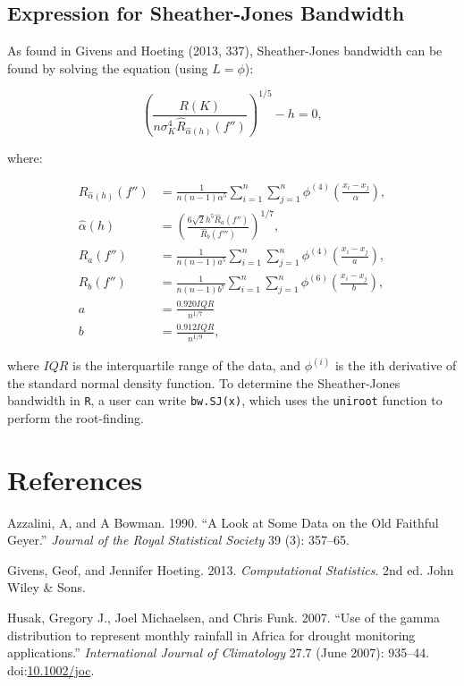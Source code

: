 \documentclass[]{article}
\begin{document}
\subsection{Expression for Sheather-Jones
Bandwidth}\label{expression-for-sheather-jones-bandwidth}

As found in Givens and Hoeting (2013, 337), Sheather-Jones bandwidth can
be found by solving the equation (using \(L = \phi\)):

\[
\left( \frac{R(K)}{n\sigma^4_K\hat{R}_{\hat{\alpha}(h)}(f'')} \right)^{1/5} - h = 0,
\]

where:

\[
\begin{aligned}
\hat{R}_{\hat{\alpha}(h)}(f'') &= \frac{1}{n(n-1)\alpha^5}\sum_{i = 1}^{n}\sum_{j=1}^{n}\phi^{(4)}\left(\frac{x_i - x_j}{\alpha}\right), \\
\hat{\alpha}(h) &= \left(\frac{6\sqrt{2}h^5\hat{R}_a(f'')}{\hat{R}_b(f''')}\right)^{1/7},\\
\hat{R}_a(f'') &= \frac{1}{n(n-1)a^5}\sum_{i = 1}^{n}\sum_{j=1}^{n}\phi^{(4)}\left(\frac{x_i - x_j}{a}\right), \\
\hat{R}_b(f'') &= \frac{1}{n(n-1)b^7}\sum_{i = 1}^{n}\sum_{j=1}^{n}\phi^{(6)}\left(\frac{x_i - x_j}{b}\right), \\
a &= \frac{0.920 IQR}{n^{1/7}} \\
b &= \frac{0.912 IQR}{n^{1/9}},
\end{aligned}
\]

where \(IQR\) is the interquartile range of the data, and \(\phi^{(i)}\)
is the ith derivative of the standard normal density function. To
determine the Sheather-Jones bandwidth in \texttt{R}, a user can write
\texttt{bw.SJ(x)}, which uses the \texttt{uniroot} function to perform
the root-finding.

\section*{References}\label{references}

\hypertarget{refs}{}
\hypertarget{ref-Bowman1990}{}
Azzalini, A, and A Bowman. 1990. ``A Look at Some Data on the Old
Faithful Geyer.'' \emph{Journal of the Royal Statistical Society} 39
(3): 357--65.

\hypertarget{ref-Givens2013}{}
Givens, Geof, and Jennifer Hoeting. 2013. \emph{Computational
Statistics}. 2nd ed. John Wiley \& Sons.

\hypertarget{ref-Husak2007}{}
Husak, Gregory J., Joel Michaelsen, and Chris Funk. 2007. ``Use of the
gamma distribution to represent monthly rainfall in Africa for drought
monitoring applications.'' \emph{International Journal of Climatology}
27.7 (June 2007): 935--44.
doi:\href{https://doi.org/10.1002/joc}{10.1002/joc}.
\end{document}
